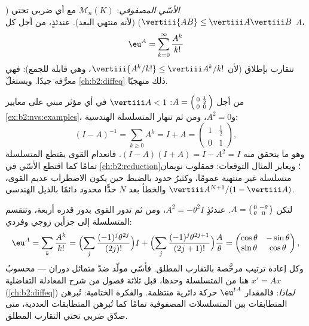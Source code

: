 \begin{example}\label{ex:b2:nvs:matrixexp}
\emph{الأسّي المصفوفي}:
$\mathcal{M}_n(K)$ مع أي  ضربي تحتي ($\vertiii{AB}
\leq \vertiii A \vertiii B$)  (لأنه منتهي البعد). عندئذٍ، من أجل
كل $A$،
\[
\eu^A = \sum_{k=0}^{\infty} \frac{A^k}{k!}
\]
تتقارب بإطلاق (لأن $\vertiii{A^k/k!} \leq \vertiii A^k /k!$،
وهي قابلة للجمع): فهي معرَّفة جيدًا. ويستغلّ \cref{ch:b2:diffeq} ذلك
منهجيًا.
\end{example}

\begin{example}\label{ex:b2:nvs:neumannfinite}
من أجل $A = \begin{psmallmatrix}0 & \frac12\\ 0 &
0\end{psmallmatrix}$: $\vertiii A < 1$ في أي  مؤثر
مبني على معايير \cref{ex:b2:nvs:examples}، و$A^2 = 0$، ومن ثم
تنهار المتسلسلة الهندسية:
\[
(I - A)^{-1} = \sum_{k \geq 0} A^k = I + A =
\begin{pmatrix}1 & \tfrac12\\ 0 & 1\end{pmatrix},
\]
وهو ما يتحقق منه $(I - A)(I + A) = I - A^2 = I$. فانعدام القوى
يقتطع المتسلسلة تمامًا كما اقتطع الأسّي في
\cref{ch:b2:reduction}؛ ويعاير المثال
التوقعات: فمقلوب نويمان متسلسلة غير منتهية
عمومًا، وكثيرُ حدود بالضبط حين يكون الاضطراب
عديم القوى، والخطأ بعد $N$ حدًّا محدود دائمًا
بالذيل الهندسي $\vertiii A^{N+1}/(1 - \vertiii A)$.
\end{example}

\begin{example}\label{ex:b2:nvs:rotationexp}
لتكن $A = \begin{psmallmatrix}0 & -\theta\\ \theta &
0\end{psmallmatrix}$. عندئذٍ $A^2 = -\theta^2 I$، ومن ثم تدور
القوى بدور قدره أربعة، وتنقسم المتسلسلة إلى جزأين زوجي
وفردي:
\[
\eu^{A} = \sum_{k}\frac{A^k}{k!}
= \Bigl(\sum_{j}\frac{(-1)^j\theta^{2j}}{(2j)!}\Bigr) I
+ \Bigl(\sum_{j}\frac{(-1)^j\theta^{2j+1}}{(2j+1)!}\Bigr)
\frac{A}{\theta}
= \begin{pmatrix}
\cos\theta & -\sin\theta\\
\sin\theta & \cos\theta
\end{pmatrix},
\]
وكل إعادة ترتيب مرخَّصة بالتقارب المطلق. فأسّي
مولّد ضدّ متماثل دوران ---
محسوبٌ هنا من المتسلسلة وحدها، قبل ثلاثة فصول من
شرح المعادلة التفاضلية $x' = Ax$ (\cref{ch:b2:diffeq})
\emph{لماذا}: فالمقدار $\eu^{tA}$ حركة دائرية منتظمة. والفكرة
الختامية: تُبرهن المتطابقات بين المتسلسلات المصفوفية تمامًا كما
تُبرهن المتطابقات العددية، متى صدّق  ضربي تحتي التقارب المطلق.
\end{example}

